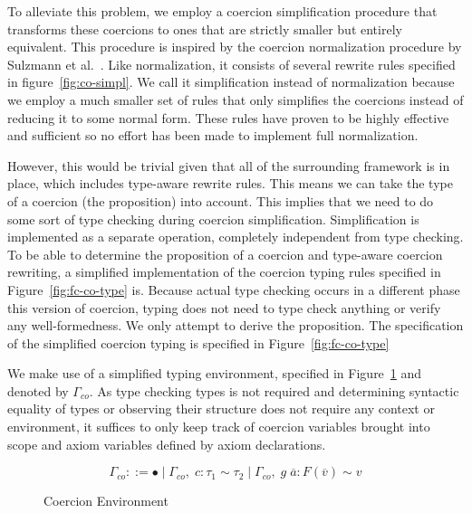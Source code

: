To alleviate this problem, we employ a coercion simplification procedure that
transforms these coercions to ones that are strictly smaller but entirely
equivalent. This procedure is inspired by the coercion normalization procedure
by Sulzmann et al.~\cite{Sulzmann:2007:SFT:1190315.1190324}. Like
normalization, it consists of several rewrite rules specified in
figure~\ref{fig:co-simpl}. We call it simplification instead of normalization
because we employ a much smaller set of rules that only simplifies the coercions
instead of reducing it to some normal form. These rules have proven to be highly
effective and sufficient so no effort has been made to implement full
normalization.

However, this would be trivial given that all of the surrounding framework is in
place, which includes type-aware rewrite rules. This means we can take the type
of a coercion (the proposition) into account. This implies that we need to do
some sort of type checking during coercion simplification.  Simplification is
implemented as a separate operation, completely independent from type checking.
To be able to determine the proposition of a coercion and type-aware coercion
rewriting, a simplified implementation of the coercion typing rules specified in
Figure~\ref{fig:fc-co-type} is. Because actual type checking occurs in a
different phase this version of coercion, typing does not need to type check
anything or verify any well-formedness. We only attempt to derive the
proposition. The specification of the simplified coercion typing is specified in
Figure~\ref{fig:fc-co-type}

We make use of a simplified typing environment, specified in
Figure~\ref{fig:co-env} and denoted by $\Gamma_{co}$. As type checking types is
not required and determining syntactic equality of types or observing their
structure does not require any context or environment, it suffices to only keep
track of coercion variables brought into scope and axiom variables defined by
axiom declarations.

\begin{figure}
\[
\Gamma_{co} ::= \bullet \mid \Gamma_{co}, \; c : \tau_1 \sim \tau_2 \mid
\Gamma_{co}, \; g \; \overline{a} : F(\overline{v}) \sim v
\]
\caption{Coercion Environment}
\label{fig:co-env}
\end{figure}
